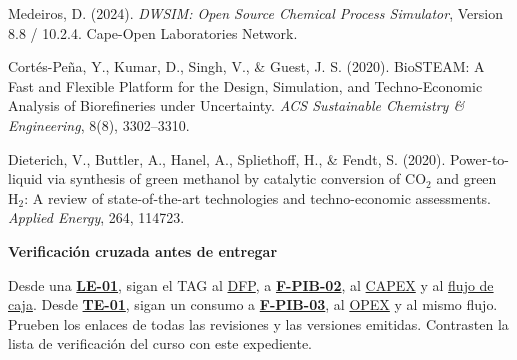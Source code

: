 \documentclass[11pt,letterpaper]{article}
\newcommand{\Guia}[2]{%
  \begin{tcolorbox}[colback=Arena,colframe=Terracota,boxrule=0.35pt,
    leftrule=2pt,arc=0pt,left=7pt,right=7pt,
    top=4pt,bottom=4pt,before skip=5pt,after skip=5pt]
    {\sffamily\small\bfseries\color{Grafito}#1}\par #2
  \end{tcolorbox}}
\newcommand{\Ficha}[1]{\hyperlink{ev:#1}{\textsf{\textbf{#1}}}}
\begin{document}
\begin{enumerate}[label={[\arabic*]},leftmargin=2em,itemsep=3pt]
  \item Medeiros, D. (2024). \textit{DWSIM: Open Source Chemical Process Simulator}, Version 8.8 / 10.2.4. Cape-Open Laboratories Network.
  \item Cortés-Peña, Y., Kumar, D., Singh, V., \& Guest, J. S. (2020). BioSTEAM: A Fast and Flexible Platform for the Design, Simulation, and Techno-Economic Analysis of Biorefineries under Uncertainty. \textit{ACS Sustainable Chemistry \& Engineering}, 8(8), 3302--3310.
  \item Dieterich, V., Buttler, A., Hanel, A., Spliethoff, H., \& Fendt, S. (2020). Power-to-liquid via synthesis of green methanol by catalytic conversion of $\mbox{CO}_2$ and green $\mbox{H}_2$: A review of state-of-the-art technologies and techno-economic assessments. \textit{Applied Energy}, 264, 114723.
\end{enumerate}

\label{sec:documentacion}
\Guia{Verificación cruzada antes de entregar}{%
  Desde una \Ficha{LE-01}, sigan el TAG al \hyperref[fig:dfpv1]{DFP},
  a \Ficha{F-PIB-02}, al \hyperref[sec:capex]{CAPEX} y al
  \hyperref[sec:flujo]{flujo de caja}. Desde \Ficha{TE-01}, sigan un
  consumo a \Ficha{F-PIB-03}, al \hyperref[sec:opex]{OPEX} y al mismo
  flujo. Prueben los enlaces de todas las revisiones y las versiones emitidas.
  Contrasten la lista de verificación del curso con este expediente.}
\end{document}
